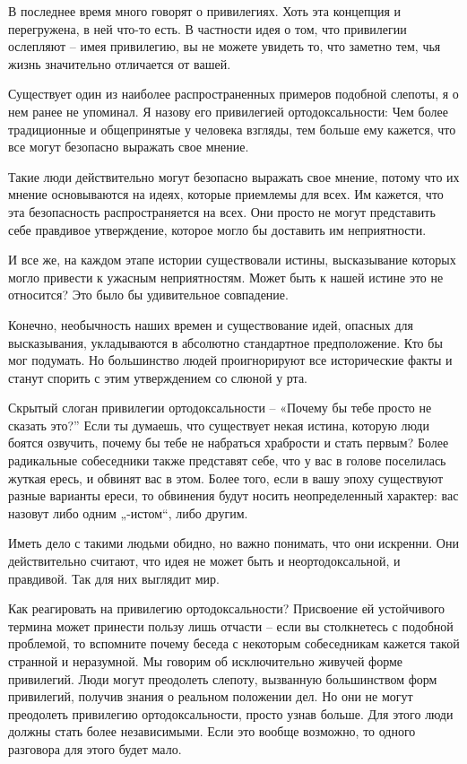 \documentclass[ebook,12pt,oneside,openany]{memoir}
\date{}
\begin{document}
\maketitle

В последнее время много говорят о привилегиях. Хоть эта концепция и
перегружена, в ней что-то есть. В частности идея о том, что привилегии
ослепляют – имея привилегию, вы не можете увидеть то, что заметно тем,
чья жизнь значительно отличается от вашей.

Существует один из наиболее распространенных примеров подобной
слепоты, я о нем ранее не упоминал. Я назову его привилегией
ортодоксальности: Чем более традиционные и общепринятые у человека
взгляды, тем больше ему кажется, что все могут безопасно выражать свое
мнение.

Такие люди действительно могут безопасно выражать свое мнение, потому
что их мнение основываются на идеях, которые приемлемы для всех. Им
кажется, что эта безопасность распространяется на всех. Они просто не
могут представить себе правдивое утверждение, которое могло бы
доставить им неприятности.

И все же, на каждом этапе истории существовали истины, высказывание
которых могло привести к ужасным неприятностям. Может быть к нашей
истине это не относится? Это было бы удивительное совпадение.

Конечно, необычность наших времен и существование идей, опасных для
высказывания, укладываются в абсолютно стандартное предположение. Кто
бы мог подумать. Но большинство людей проигнорируют все исторические
факты и станут спорить с этим утверждением со слюной у рта.

Скрытый слоган привилегии ортодоксальности – «Почему бы тебе просто не
сказать это?” Если ты думаешь, что существует некая истина, которую
люди боятся озвучить, почему бы тебе не набраться храбрости и стать
первым? Более радикальные собеседники также представят себе, что у вас
в голове поселилась жуткая ересь, и обвинят вас в этом. Более того,
если в вашу эпоху существуют разные варианты ереси, то обвинения будут
носить неопределенный характер: вас назовут либо одним „-истом“, либо
другим.

Иметь дело с такими людьми обидно, но важно понимать, что они
искренни. Они действительно считают, что идея не может быть и
неортодоксальной, и правдивой. Так для них выглядит мир.

Как реагировать на привилегию ортодоксальности? Присвоение ей
устойчивого термина может принести пользу лишь отчасти – если вы
столкнетесь с подобной проблемой, то вспомните почему беседа с
некоторым собеседникам кажется такой странной и неразумной. Мы говорим
об исключительно живучей форме привилегий. Люди могут преодолеть
слепоту, вызванную большинством форм привилегий, получив знания о
реальном положении дел. Но они не могут преодолеть привилегию
ортодоксальности, просто узнав больше. Для этого люди должны стать
более независимыми. Если это вообще возможно, то одного разговора для
этого будет мало.
\end{document}
